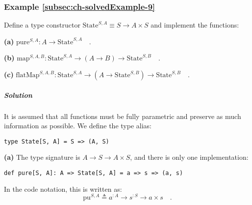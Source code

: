 \subsubsection{Example \label{subsec:ch-solvedExample-9}\ref{subsec:ch-solvedExample-9}}

Define a type constructor $\text{State}^{S,A}\equiv S\rightarrow A\times S$
and implement the functions:

\textbf{(a)} $\text{pure}^{S,A}:A\rightarrow\text{State}^{S,A}\quad.$

\textbf{(b)} $\text{map}^{S,A,B}:\text{State}^{S,A}\rightarrow(A\rightarrow B)\rightarrow\text{State}^{S,B}\quad.$

\textbf{(c)} $\text{flatMap}^{S,A,B}:\text{State}^{S,A}\rightarrow(A\rightarrow\text{State}^{S,B})\rightarrow\text{State}^{S,B}\quad.$

\subparagraph{Solution}

It is assumed that all functions must be fully parametric and preserve
as much information as possible. We define the type alias:
\begin{lstlisting}
type State[S, A] = S => (A, S)
\end{lstlisting}

\textbf{(a)} The type signature is $A\rightarrow S\rightarrow A\times S$,
and there is only one implementation:
\begin{lstlisting}
def pure[S, A]: A => State[S, A] = a => s => (a, s)
\end{lstlisting}
In the code notation, this is written as:
\[
\text{pu}^{S,A}\triangleq a^{:A}\rightarrow s^{:S}\rightarrow a\times s\quad.
\]

